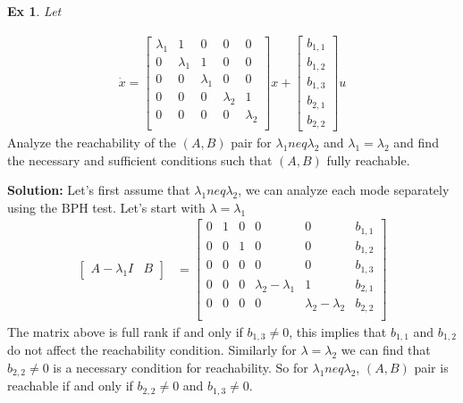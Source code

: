 \documentclass[twoside]{article}
\newtheorem{exmp}[theorem]{Ex}
\begin{document}
\begin{exmp}
Let 
\end{exmp}
%
%
\begin{align*}
    \dot{x} = \left[
 \begin{array}{ccc|cc} \lambda_1 & 1 & 0 & 0 & 0 \\
     0 & \lambda_1 & 1 & 0 & 0 
    \\
    0 & 0 & \lambda_1 &  0 & 0 \\
    \hline
    0 & 0 & 0 & \lambda_2 & 1 \\
    0 & 0 & 0 & 0 & \lambda_2 \\
    \end{array} \right]
    x + \left[ \begin{array}{c} b_{1,1} \\ b_{1,2} 
    \\ b_{1,3} \\ b_{2,1} \\ b_{2,2}  
  \end{array} \right] u
\end{align*}
% 
Analyze the reachability of the $(A,B)$ pair for $\lambda_1 
neq \lambda_2$ and $\lambda_1 = \lambda_2$
and find the necessary and sufficient conditions such that 
$(A,B)$ fully reachable.

\textbf{Solution:} Let's first assume that $\lambda_1 
neq \lambda_2$, we can analyze each mode separately using the BPH test. Let's start with $\lambda = \lambda_1$
%
\begin{align*}
  \left[ \begin{array}{c|c} A - \lambda_1 I & B \end{array} \right]
  &= \left[  \begin{array}{ccc|cc|c} 0 & 1 & 0 & 0 & 0 & b_{1,1} \\
     0 & 0 & 1 & 0 & 0 & b_{1,2}
    \\
    0 & 0 & 0 &  0 & 0 & b_{1,3 }\\
    \hline
    0 & 0 & 0 & \lambda_2 - \lambda_1 & 1 & b_{2,1} \\
    0 & 0 & 0 & 0 & \lambda_2 - \lambda_2 & b_{2,2}   \\
    \end{array} \right]
\end{align*}
%
The matrix above is full rank if and only if $b_{1,3}  
\neq 0$,
this implies that $b_{1,1}$ and $b_{1,2}$ do not affect
the reachability condition. Similarly for $\lambda = \lambda_2$
we can find that $b_{2,2} \neq 0$ is a necessary condition for 
reachability. So for $\lambda_1 neq \lambda_2$, $(A,B)$ pair
is reachable if and only if $b_{2,2} \neq 0$ and $b_{1,3} \neq 0$.
\end{document}
